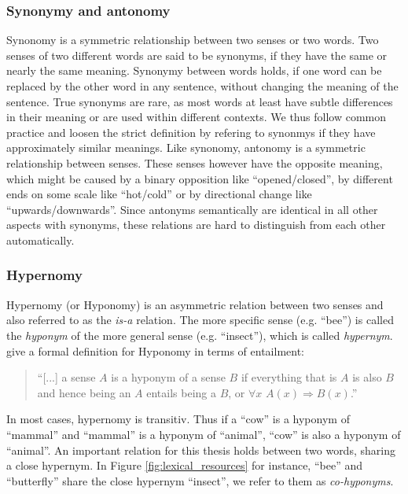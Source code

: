 \subsubsection{Synonymy and antonomy}
Synonomy is a symmetric relationship between two senses or two words. Two senses of two different words are said to be synonyms, if they have the same or nearly the same meaning. Synonymy between words holds, if one word can be replaced by the other word in any sentence, without changing the meaning of the sentence. True synonyms are rare, as most words at least have subtle differences in their meaning or are used within different contexts. We thus follow common practice and loosen the strict definition by refering to synonmys if they have approximately similar meanings. Like synonomy, antonomy is a symmetric relationship between senses. These senses however have the opposite meaning, which might be caused by a binary opposition like ``opened/closed'', by different ends on some scale like ``hot/cold'' or by directional change like ``upwards/downwards''. Since antonyms semantically are identical in all other aspects with synonyms, these relations are hard to distinguish from each other automatically.

\subsubsection{Hypernomy}
Hypernomy (or Hyponomy) is an asymmetric relation between two senses and also referred to as the \textit{is-a} relation. The more specific sense (e.g. ``bee'') is called the \textit{hyponym} of the more general sense (e.g. ``insect''), which is called \textit{hypernym}. \cite{Jurafsky2008May} give a formal definition for Hyponomy in terms of entailment: 
\begin{quotation}\noindent
``[...] a sense $A$ is a hyponym of a sense $B$ if everything that is $A$ is also $B$ and hence being an $A$ entails being a $B$, or $\forall x$ $A(x) \Rightarrow B(x)$.'' \citep{Jurafsky2008May}
\end{quotation}
In most cases, hypernomy is transitiv. Thus if a ``cow'' is a hyponym of ``mammal'' and ``mammal'' is a hyponym of ``animal'', ``cow'' is also a hyponym of ``animal''. An important relation for this thesis holds between two words, sharing a close hypernym. In Figure \ref{fig:lexical_resources} for instance, ``bee'' and ``butterfly'' share the close hypernym ``insect'', we refer to them as \textit{co-hyponyms}.

